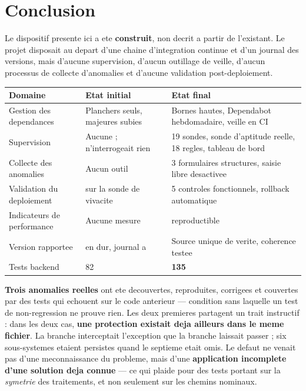 \section{Conclusion}

Le dispositif presente ici a ete \textbf{construit}, non decrit a partir de l'existant. Le projet
disposait au depart d'une chaine d'integration continue et d'un journal des versions, mais d'aucune
supervision, d'aucun outillage de veille, d'aucun processus de collecte d'anomalies et d'aucune
validation post-deploiement.

\footnotesize
\begin{tabularx}{\linewidth}{@{}L{4.2cm} L{4.6cm} X@{}}
\toprule
\textbf{Domaine} & \textbf{Etat initial} & \textbf{Etat final} \\
\midrule
Gestion des dependances & Planchers seuls, majeures subies & Bornes hautes, Dependabot hebdomadaire, veille en CI \\
Supervision & Aucune ;  n'interrogeait rien & 19 sondes, sonde d'aptitude reelle, 18 regles, tableau de bord \\
Collecte des anomalies & Aucun outil & 3 formulaires structures, saisie libre desactivee \\
Validation du deploiement &  sur la sonde de vivacite & 5 controles fonctionnels, rollback automatique \\
Indicateurs de performance & Aucune mesure &  reproductible \\
Version rapportee &  en dur, journal a  & Source unique de verite, coherence testee \\
Tests backend & 82 & \textbf{135} \\
\bottomrule
\end{tabularx}
\normalsize

\vspace{5pt}
\textbf{Trois anomalies reelles} ont ete decouvertes, reproduites, corrigees et couvertes par des
tests qui echouent sur le code anterieur --- condition sans laquelle un test de non-regression ne
prouve rien. Les deux premieres partagent un trait instructif : dans les deux cas, \textbf{une
protection existait deja ailleurs dans le meme fichier}. La branche  interceptait
l'exception que la branche  laissait passer ; six sous-systemes etaient persistes
quand le septieme etait omis. Le defaut ne venait pas d'une meconnaissance du probleme, mais d'une
\textbf{application incomplete d'une solution deja connue} --- ce qui plaide pour des tests portant
sur la \emph{symetrie} des traitements, et non seulement sur les chemins nominaux.

